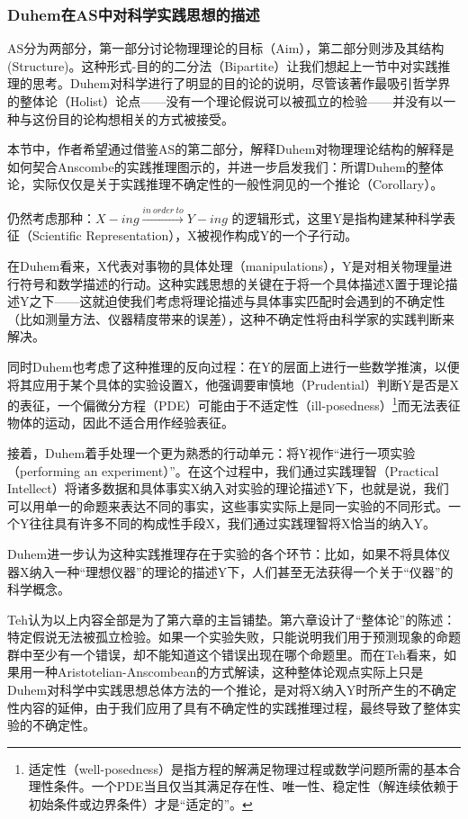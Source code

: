 \documentclass[12pt, a4paper, oneside]{ctexart}
\newcommand{\f}{\footnote}
\begin{document}
\subsubsection{Duhem在AS中对科学实践思想的描述}
AS分为两部分，第一部分讨论物理理论的目标（Aim），第二部分则涉及其结构(Structure)。这种形式-目的的二分法（Bipartite）让我们想起上一节中对实践推理的思考。Duhem对科学进行了明显的目的论的说明，尽管该著作最吸引哲学界的整体论（Holist）论点——没有一个理论假说可以被孤立的检验——并没有以一种与这份目的论构想相关的方式被接受。

本节中，作者希望通过借鉴AS的第二部分，解释Duhem对物理理论结构的解释是如何契合Anscombe的实践推理图示的，并进一步启发我们：所谓Duhem的整体论，实际仅仅是关于实践推理不确定性的一般性洞见的一个推论（Corollary）。

仍然考虑那种：$X-ing \xrightarrow{in\ order\ to}Y-ing$ 的逻辑形式，这里Y是指构建某种科学表征（Scientific Representation），X被视作构成Y的一个子行动。

在Duhem看来，X代表对事物的具体处理（manipulations），Y是对相关物理量进行符号和数学描述的行动。这种实践思想的关键在于将一个具体描述X置于理论描述Y之下——这就迫使我们考虑将理论描述与具体事实匹配时会遇到的不确定性（比如测量方法、仪器精度带来的误差），这种不确定性将由科学家的实践判断来解决。

同时Duhem也考虑了这种推理的反向过程：在Y的层面上进行一些数学推演，以便将其应用于某个具体的实验设置X，他强调要审慎地（Prudential）判断Y是否是X的表征，一个偏微分方程（PDE）可能由于不适定性（ill-posedness）\f{适定性（well-posedness）是指方程的解满足物理过程或数学问题所需的基本合理性条件。一个PDE当且仅当其满足存在性、唯一性、稳定性（解连续依赖于初始条件或边界条件）才是“适定的”。}而无法表征物体的运动，因此不适合用作经验表征。

接着，Duhem着手处理一个更为熟悉的行动单元：将Y视作“进行一项实验（performing an experiment）”。在这个过程中，我们通过实践理智（Practical Intellect）将诸多数据和具体事实X纳入对实验的理论描述Y下，也就是说，我们可以用单一的命题来表达不同的事实，这些事实实际上是同一实验的不同形式。一个Y往往具有许多不同的构成性手段X，我们通过实践理智将X恰当的纳入Y。

Duhem进一步认为这种实践推理存在于实验的各个环节：比如，如果不将具体仪器X纳入一种“理想仪器”的理论的描述Y下，人们甚至无法获得一个关于“仪器”的科学概念。

Teh认为以上内容全部是为了第六章的主旨铺垫。第六章设计了“整体论”的陈述：特定假说无法被孤立检验。如果一个实验失败，只能说明我们用于预测现象的命题群中至少有一个错误，却不能知道这个错误出现在哪个命题里。而在Teh看来，如果用一种Aristotelian-Anscombean的方式解读，这种整体论观点实际上只是Duhem对科学中实践思想总体方法的一个推论，是对将X纳入Y时所产生的不确定性内容的延伸，由于我们应用了具有不确定性的实践推理过程，最终导致了整体实验的不确定性。
\end{document}
